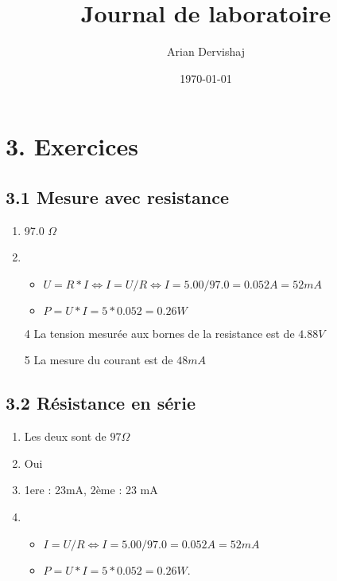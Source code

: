 \documentclass[a4paper, 12pt]{article}
\title{Journal de laboratoire}
\author{Arian Dervishaj}
\date{\today}
\begin{document}
\maketitle
\pagebreak

\section*{3. Exercices}
\subsection*{3.1 Mesure avec resistance}
\begin{enumerate}
    \item 97.0 $\Omega$
    \item \begin{itemize}
        \item $U = R*I \Longleftrightarrow I = U/R \Longleftrightarrow I = 5.00 / 97.0 = 0.052 A = 52 mA $
        \item $P = U * I = 5 * 0.052 = 0.26W$
        \end{itemize} 
    \item[4] La tension mesurée aux bornes de la resistance est de $4.88V$
    \item[5] La mesure du courant est de $48 mA$
\end{enumerate}

\subsection*{3.2 Résistance en série}
\begin{enumerate}
    \item Les deux sont de $97 \Omega$
    \item Oui
    \item 1ere : 23mA, 2ème : 23 mA
    \item \begin{itemize}
        \item $I = U/R \Longleftrightarrow I = 5.00 / 97.0 = 0.052 A = 52 mA $
        \item $P = U * I = 5 * 0.052 = 0.26W.$
        \end{itemize} 
\end{enumerate}
\end{document}

